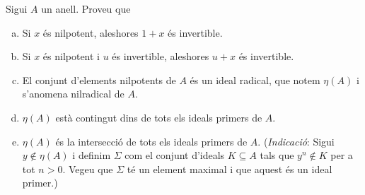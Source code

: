 \documentclass[../main.tex]{subfiles}
\begin{document}
\begin{exercici}
\label{esal27}
Sigui $A$ un anell. Proveu que
\begin{enumerate}[(a)]
    \item Si $x$ és nilpotent, aleshores $1+x$ és invertible.
    \item Si $x$ és nilpotent i $u$ és invertible, aleshores $u+x$ és invertible.
    \item El conjunt d'elements nilpotents de $A$ és un ideal radical, que notem $\eta(A)$ i s'anomena nilradical de $A$.
    \item $\eta(A)$ està contingut dins de tots els ideals primers de $A$.
    \item $\eta(A)$ és la intersecció de tots els ideals primers de $A$. (\textit{Indicació}: Sigui $y\not\in\eta(A)$ i definim $\Sigma$ com el conjunt d'ideals $K\subseteq A$ tals que $y^n\not\in K$ per a tot $n>0$. Vegeu que $\Sigma$ té un element maximal i que aquest és un ideal primer.)
\end{enumerate}
\end{exercici}
\end{document}
